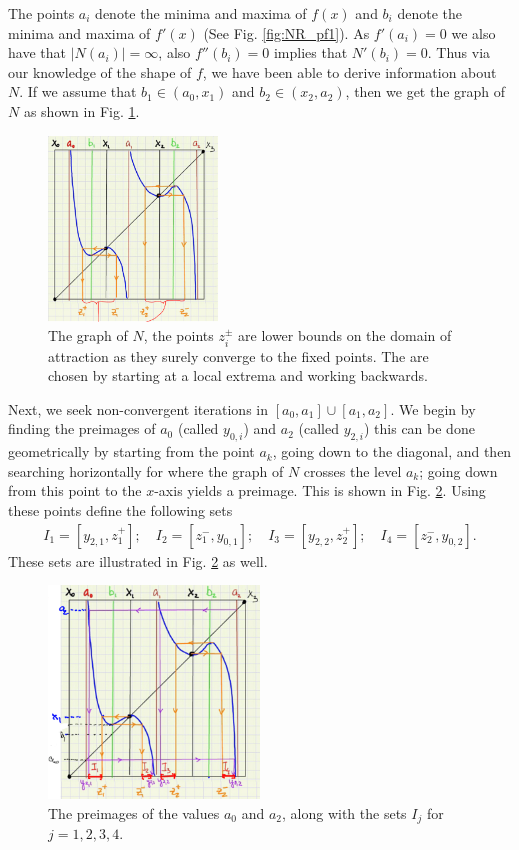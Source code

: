 \begin{ex}
The points $a_i$ denote the minima and maxima of $f(x)$ and $b_i$ denote the minima and maxima of $f'(x)$ (See Fig. \ref{fig:NR_pf1}). As $f'(a_i)=0$ we also have that $|N(a_i)|=\infty $, also $f''(b_i)=0$ implies that $N'(b_i)=0$. Thus via our knowledge of the shape of $f$, we have been able to derive information about $N$. If we assume that $b_1\in (a_0, x_1)$ and $b_2\in (x_2, a_2)$, then we get the graph of $N$ as shown in Fig. \ref{fig:NR_graph1}.
\begin{figure}[h!]
	\centering
	\includegraphics[width=0.4\textwidth]{figures/ch7/3NR_graph1.png}
	\caption{The graph of $N$, the points $z_{i}^{\pm}$ are lower bounds on the domain of attraction as they surely converge to the fixed points. The are chosen by starting at a local extrema and working backwards.}
	\label{fig:NR_graph1}
\end{figure}

Next, we seek non-convergent iterations in $[a_0, a_1] \cup [a_1, a_2]$. We begin by finding the preimages of $a_0$ (called $y_{0,i}$) and $a_2 $ (called $y_{2,i}$) this can be done geometrically by starting from the point $a_k$, going down to the diagonal, and then searching horizontally for where the graph of $N$ crosses the level $a_k$; going down from this point to the $x$-axis yields a preimage. This is shown in Fig. \ref{fig:NR_preimages}. Using these points define the following sets
\begin{align}
	I_{1} = [y_{2,1}, z_{1}^{+}];\quad
	I_{2} = [z_{1}^{-}, y_{0,1}];\quad
	I_{3} = [y_{2,2}, z_{2}^{+}];\quad
	I_{4} = [z_{2}^{-}, y_{0,2}].
\end{align}
These sets are illustrated in Fig. \ref{fig:NR_preimages} as well.
\begin{figure}[h!]
	\centering
	\includegraphics[width=0.5\textwidth]{figures/ch7/4NR_preimages.png}
	\caption{The preimages of the values $a_0$ and $a_2$, along with the sets $I_{j}$ for $j=1,2,3,4$.}
	\label{fig:NR_preimages}
\end{figure}


\end{ex}
